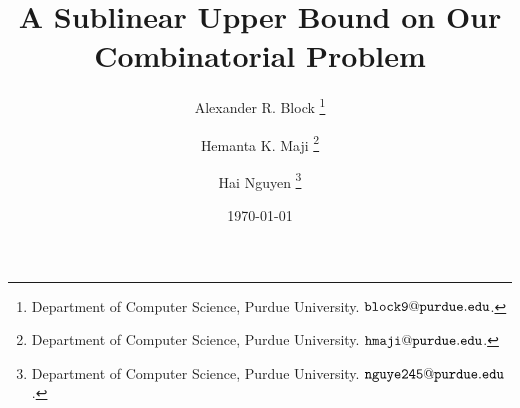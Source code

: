 \documentclass[
xcolor={svgnames},
hyperref={colorlinks,citecolor=DeepPink4,linkcolor=DarkRed,urlcolor=DarkBlue},
]{beamer}
\author{
  Alexander R. Block%
\ifcomment
  \thanks{
	Department of Computer Science,
	Purdue University.
	\href{mailto:\alexemail}{$\mathtt{block9@purdue.edu}$}.
  }\and 
  Hemanta K. Maji%
  \thanks{
    Department of Computer Science,
    Purdue University.
    \href{mailto:\majiemail}{$\mathtt{hmaji@purdue.edu}$}.
  }\and
  Hai Nguyen%
  \thanks{
	Department of Computer Science,
	Purdue University.
	\href{mailto:\haiemail}{$\mathtt{nguye245@purdue.edu}$}.
  } \fi
}
\title{A Sublinear Upper Bound on Our Combinatorial Problem}
\date{\today}
\begin{document}
\frame{\maketitle}

\frame{\tableofcontents}













\end{document}
